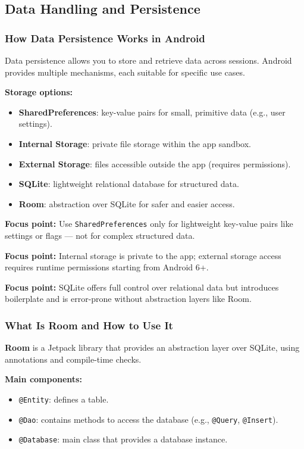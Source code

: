 \documentclass[a4paper,12pt]{article}
\begin{document}
\subsection{Data Handling and Persistence}

\subsubsection{How Data Persistence Works in Android}

Data persistence allows you to store and retrieve data across sessions. Android provides multiple mechanisms, each suitable for specific use cases.

\textbf{Storage options:}
\begin{itemize}
  \item \textbf{SharedPreferences}: key-value pairs for small, primitive data (e.g., user settings).
  \item \textbf{Internal Storage}: private file storage within the app sandbox.
  \item \textbf{External Storage}: files accessible outside the app (requires permissions).
  \item \textbf{SQLite}: lightweight relational database for structured data.
  \item \textbf{Room}: abstraction over SQLite for safer and easier access.
\end{itemize}

\textbf{Focus point:} Use \texttt{SharedPreferences} only for lightweight key-value pairs like settings or flags — not for complex structured data.

\textbf{Focus point:} Internal storage is private to the app; external storage access requires runtime permissions starting from Android 6+.

\textbf{Focus point:} SQLite offers full control over relational data but introduces boilerplate and is error-prone without abstraction layers like Room.

\subsubsection{What Is Room and How to Use It}

\textbf{Room} is a Jetpack library that provides an abstraction layer over SQLite, using annotations and compile-time checks.

\textbf{Main components:}
\begin{itemize}
  \item \texttt{@Entity}: defines a table.
  \item \texttt{@Dao}: contains methods to access the database (e.g., \texttt{@Query}, \texttt{@Insert}).
  \item \texttt{@Database}: main class that provides a database instance.
\end{itemize}
\end{document}
